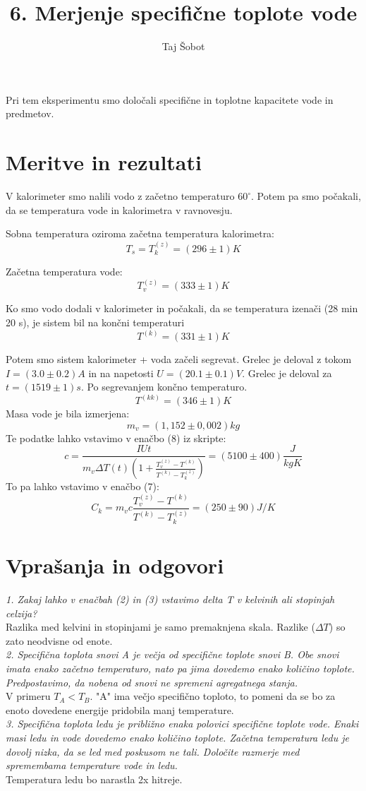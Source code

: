 \documentclass[11pt]{article}
\title{6. Merjenje specifične toplote vode}
\author{Taj Šobot}
\begin{document}
    \maketitle
    \flushleft
    Pri tem eksperimentu smo določali specifične in toplotne kapacitete vode in predmetov.


    \section{Meritve in rezultati}
    V kalorimeter smo nalili vodo z začetno temperaturo $60 ^\circ$.
    Potem pa smo počakali, da se temperatura vode in kalorimetra v ravnovesju.

    Sobna temperatura oziroma začetna temperatura kalorimetra:
    \[
        T_s = T_k^{(z)} = (296 \pm 1) K
    \]

    Začetna temperatura vode:
    \[
        T_v^{(z)} = (333 \pm 1) K
    \]

    Ko smo vodo dodali v kalorimeter in počakali, da se temperatura izenači (28 min 20 s), je sistem bil na končni temperaturi
    \[
        T^{(k)} = (331 \pm 1) K
    \]

    Potem smo sistem kalorimeter + voda začeli segrevat.
    Grelec je deloval z tokom $I = (3.0 \pm 0.2) A$ in na napetosti $U = (20.1 \pm 0.1) V$.
    Grelec je deloval za $t = (1519 \pm 1)s $.
    Po segrevanjem končno temperaturo.
    \[
        T^{(kk)} = (346 \pm 1 )K
    \]
    Masa vode je bila izmerjena:
    \[
        m_v = (1,152 \pm 0,002)kg
    \]
    Te podatke lahko vstavimo v enačbo (8) iz skripte:
    \[
        c = \frac{I U t}{m_v \Delta T(t)\left(1+ \frac{T_v^{(z)} - T^{(k)}  }{ T^{(k)}  - T_k^{(z)}}\right)} = (5100 \pm 400) \frac{J}{kg K}
    \]
    To pa lahko vstavimo v enačbo (7):
    \[
        C_k = m_v c \frac{ T_v^{(z)} - T^{(k)}}{T^{(k)} - T_k^{(z)}} = (250 \pm 90) J/K
    \]

    \section{Vprašanja in odgovori}
    \textit{1. Zakaj lahko v enačbah (2) in (3) vstavimo delta T v kelvinih ali stopinjah celzija?}
    \\
    Razlika med kelvini in stopinjami je samo premaknjena skala.
    Razlike ($\Delta T$) so zato neodvisne od enote.
    \\
    \textit{2. Specifična toplota snovi A je večja od specifične toplote snovi B. Obe snovi imata enako
    začetno temperaturo, nato pa jima dovedemo enako količino toplote. Predpostavimo, da nobena
    od snovi ne spremeni agregatnega stanja.}
    \\
    V primeru $T_A < T_B$.
    "A" ima večjo specifično toploto, to pomeni da se bo za enoto dovedene energije pridobila manj temperature.
    \\
    \textit{3. Specifična toplota ledu je približno enaka polovici specifične toplote vode. Enaki masi ledu
    in vode dovedemo enako količino toplote. Začetna temperatura ledu je dovolj nizka, da se led
    med poskusom ne tali. Določite razmerje med spremembama temperature vode in ledu.}
    \\
    Temperatura ledu bo narastla 2x hitreje.
\end{document}
